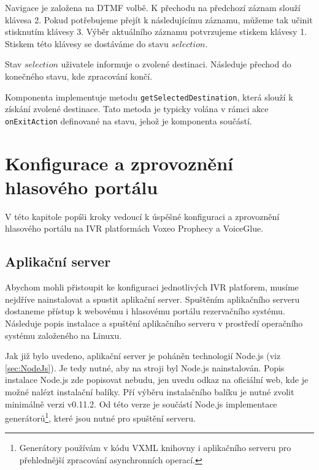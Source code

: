 \documentclass[ing,male,java,dept460]{diploma}						%
\begin{document}
Navigace je založena na DTMF volbě. K přechodu na předchozí záznam slouží klávesa 2. Pokud potřebujeme přejít k následujícímu záznamu, můžeme tak učinit stisknutím klávesy 3. Výběr aktuálního záznamu potvrzujeme stiskem klávesy 1. Stiskem této klávesy se dostáváme do stavu $selection$.

Stav $selection$ uživatele informuje o zvolené destinaci. Následuje přechod do konečného stavu, kde zpracování končí.

Komponenta implementuje metodu \texttt{getSelectedDestination}, která slouží k získání zvolené destinace. Tato metoda je typicky volána v rámci akce \texttt{onExitAction} definované na stavu, jehož je komponenta součástí.



\section{Konfigurace a zprovoznění hlasového portálu}
V této kapitole popíši kroky vedoucí k úspěšné konfiguraci a zprovoznění hlasového portálu na IVR platformách Voxeo Prophecy a VoiceGlue.

\subsection{Aplikační server}
\label{sec:App_server}
Abychom mohli přistoupit ke konfiguraci jednotlivých IVR platforem, musíme nejdříve nainstalovat a spustit aplikační server. Spuštěním aplikačního serveru dostaneme přístup k webovému i hlasovému portálu rezervačního systému. Následuje popis instalace a spuštění aplikačního serveru v prostředí operačního systému založeného na Linuxu.

Jak již bylo uvedeno, aplikační server je poháněn technologií Node.js (viz \ref{sec:NodeJs}). Je tedy nutné, aby na stroji byl Node.js nainstalován. Popis instalace Node.js zde popisovat nebudu, jen uvedu odkaz na oficiální web\cite{NodeJs_install}, kde je možné nalézt instalační balíky. Pří výběru instalačního balíku je nutné zvolit minimálně verzi v0.11.2. Od této verze je součástí Node.js implementace generátorů\footnote{Generátory používám v kódu VXML knihovny i aplikačního serveru pro přehlednější zpracování asynchronních operací.}, které jsou nutné pro spuštění serveru.
\end{document}
